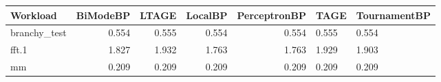 \begin{tabular}{lrrrr}
\toprule
Workload & BiModeBP & LTAGE & LocalBP & PerceptronBP & TAGE & TournamentBP \\
\midrule
branchy_test & 0.554 & 0.555 & 0.554 & 0.554 & 0.555 & 0.554 \\
fft.1 & 1.827 & 1.932 & 1.763 & 1.763 & 1.929 & 1.903 \\
mm & 0.209 & 0.209 & 0.209 & 0.209 & 0.209 & 0.209 \\
\bottomrule
\end{tabular}